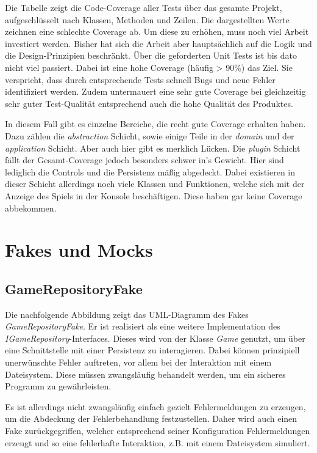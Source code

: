 Die Tabelle zeigt die Code-Coverage aller Tests über das gesamte
Projekt, aufgeschlüsselt nach Klassen, Methoden und Zeilen. Die
dargestellten Werte zeichnen eine schlechte Coverage ab. Um diese zu
erhöhen, muss noch viel Arbeit investiert werden. Bisher hat sich
die Arbeit aber hauptsächlich auf die Logik und die Design-Prinzipien
beschränkt. Über die geforderten Unit Tests ist bis dato nicht viel
passiert. Dabei ist eine hohe Coverage (häufig > 90\%) das Ziel. Sie
verspricht, dass durch entsprechende Tests schnell Bugs und neue
Fehler identifiziert werden. Zudem untermauert eine sehr gute Coverage
bei gleichzeitig sehr guter Test-Qualität entsprechend auch die hohe
Qualität des Produktes.

In diesem Fall gibt es einzelne Bereiche, die recht gute Coverage
erhalten haben. Dazu zählen die \textit{abstraction} Schicht, sowie
einige Teile in der \textit{domain} und der \textit{application}
Schicht. Aber auch hier gibt es merklich Lücken. Die \textit{plugin}
Schicht fällt der Gesamt-Coverage jedoch besonders schwer in's
Gewicht. Hier sind lediglich die Controls und die Persistenz mäßig
abgedeckt. Dabei existieren in dieser Schicht allerdings noch viele
Klassen und Funktionen, welche sich mit der Anzeige des Spiels in
der Konsole beschäftigen. Diese haben gar keine Coverage abbekommen.

\section{Fakes und Mocks}
\subsection{GameRepositoryFake}
Die nachfolgende Abbildung zeigt das UML-Diagramm des Fakes
\textit{GameRepositoryFake}. Er ist realisiert als eine weitere
Implementation des \textit{IGameRepository}-Interfaces. Dieses wird
von der Klasse \textit{Game} genutzt, um über eine Schnittstelle mit
einer Persistenz zu interagieren. Dabei können prinzipiell unerwünschte
Fehler auftreten, vor allem bei der Interaktion mit einem Dateisystem.
Diese müssen zwangsläufig behandelt werden, um ein sicheres Programm
zu gewährleisten. 

Es ist allerdings nicht zwangsläufig einfach gezielt Fehlermeldungen
zu erzeugen, um die Abdeckung der Fehlerbehandlung festzustellen. 
Daher wird auch einen Fake zurückgegriffen, welcher entsprechend
seiner Konfiguration Fehlermeldungen erzeugt und so eine fehlerhafte
Interaktion, z.B. mit einem Dateisystem simuliert.

